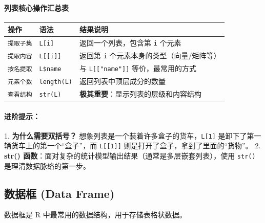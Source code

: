 \paragraph{列表核心操作汇总表}
\begin{table}[h]
\centering
\renewcommand{\arraystretch}{1.5}
\begin{tabular}{|l|l|p{7cm}|}
\hline
\textbf{操作} & \textbf{语法} & \textbf{结果说明} \\ \hline
\texttt{提取子集} & \texttt{L[i]} & 返回一个列表，包含第 \texttt{i} 个元素 \\ \hline
\texttt{提取内容} & \texttt{L[[i]]} & 返回第 \texttt{i} 个元素本身的类型（向量/矩阵等） \\ \hline
\texttt{按名提取} & \texttt{L\$name} & 与 \texttt{L[["name"]]} 等价，最常用的方式 \\ \hline
\texttt{元素个数} & \texttt{length(L)} & 返回列表中顶层成分的数量 \\ \hline
\texttt{查看结构} & \texttt{str(L)} & \textbf{极其重要}：显示列表的层级和内容结构 \\ \hline
\end{tabular}
\end{table}

\paragraph{进阶提示：}
1. \textbf{为什么需要双括号？} 想象列表是一个装着许多盒子的货车，\texttt{L[1]} 是卸下了第一辆货车上的第一个“盒子”，而 \texttt{L[[1]]} 则是打开了盒子，拿到了里面的“货物”。
2. \textbf{str() 函数}：面对复杂的统计模型输出结果（通常是多层嵌套列表），使用 \texttt{str()} 是理清数据脉络的第一步。

\subsection{数据框 (Data Frame)}

数据框是 R 中最常用的数据结构，用于存储表格状数据。

